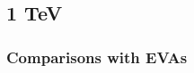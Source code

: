 \documentclass[a4paper,11pt]{article}
\begin{document}
%
%
%
\clearpage
\subsection{1 TeV}



\clearpage
\subsubsection{Comparisons with EVAs}


\end{document}
